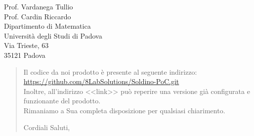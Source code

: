 \begin{letter}{
		Prof. Vardanega Tullio \\
		Prof. Cardin Riccardo \\
		Dipartimento di Matematica \\
		Università degli Studi di Padova \\
		Via Trieste, 63 \\
		35121 Padova}
\begin{quotation}
\noindent Il codice da noi prodotto è presente al seguente indirizzo:\\
\url{https://github.com/8LabSolutions/Soldino-PoC.git}\\
Inoltre, all'indirizzo <<link>> può reperire una
versione già configurata e funzionante del prodotto.\\
Rimaniamo a Sua completa disposizione per qualsiasi chiarimento.

\vspace{0.5cm}
\noindent Cordiali Saluti,
\closing{}	

\end{quotation}
		
\end{letter}

